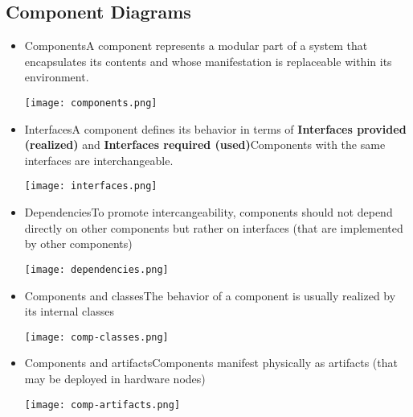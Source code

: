\documentclass[../ESOF_notes.tex]{subfiles}
\begin{document}
\subsection{Component Diagrams}
\begin{itemize}

    \item Components\newline A component represents a modular part of a system that encapsulates its contents and whose manifestation is replaceable within its environment.
          \begin{center}
              \texttt{[image: components.png]}
          \end{center}

    \item Interfaces\newline A component defines its behavior in terms of \textbf{Interfaces provided (realized)} and \textbf{Interfaces required (used)}\newline Components with the same interfaces are interchangeable.
          \begin{center}
              \texttt{[image: interfaces.png]}
          \end{center}

    \item Dependencies\newline To promote intercangeability, components should not depend directly on other components but rather on interfaces (that are implemented by other components)
          \begin{center}
              \texttt{[image: dependencies.png]}
          \end{center}

    \item Components and classes\newline The behavior of a component is usually realized by its internal classes
          \begin{center}
              \texttt{[image: comp-classes.png]}
          \end{center}

    \item Components and artifacts\newline Components manifest physically as artifacts (that may be deployed in hardware nodes)
          \begin{center}
              \texttt{[image: comp-artifacts.png]}
          \end{center}
\end{itemize}
\end{document}
